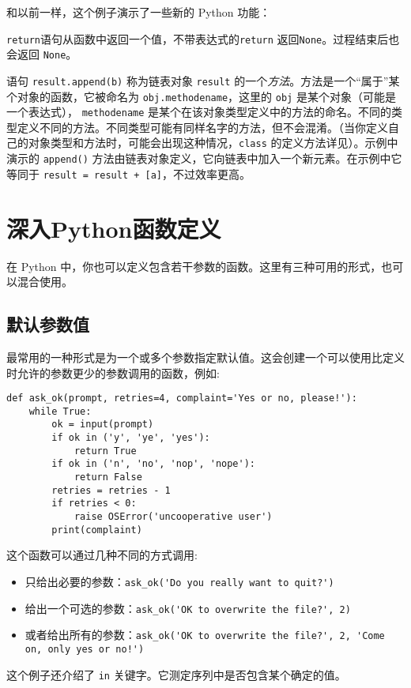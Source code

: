 和以前一样，这个例子演示了一些新的 Python 功能：
\begin{compactitem}
  \item \texttt{return}语句从函数中返回一个值，不带表达式的\texttt{return} 返回\texttt{None}。过程结束后也会返回 \texttt{None}。
  \item 语句 \texttt{result.append(b)} 称为链表对象 \texttt{result} 的一个\emph{方法}。方法是一个“属于”某个对象的函数，它被命名为 \texttt{obj.methodename}，这里的 \texttt{obj} 是某个对象（可能是一个表达式）， \texttt{methodename} 是某个在该对象类型定义中的方法的命名。不同的类型定义不同的方法。不同类型可能有同样名字的方法，但不会混淆。（当你定义自己的对象类型和方法时，可能会出现这种情况，\texttt{class} 的定义方法详见）。示例中演示的 \texttt{append()} 方法由链表对象定义，它向链表中加入一个新元素。在示例中它等同于 \texttt{result = result + [a]}，不过效率更高。
\end{compactitem}
\section{深入Python函数定义}
\label{ControlFlowTools:MoreDefFunc}
在 Python 中，你也可以定义包含若干参数的函数。这里有三种可用的形式，也可以混合使用。
\subsection{默认参数值}
最常用的一种形式是为一个或多个参数指定默认值。这会创建一个可以使用比定义时允许的参数更少的参数调用的函数，例如:
\begin{lstlisting}
def ask_ok(prompt, retries=4, complaint='Yes or no, please!'):
    while True:
        ok = input(prompt)
        if ok in ('y', 'ye', 'yes'):
            return True
        if ok in ('n', 'no', 'nop', 'nope'):
            return False
        retries = retries - 1
        if retries < 0:
            raise OSError('uncooperative user')
        print(complaint)
\end{lstlisting}

这个函数可以通过几种不同的方式调用:
\begin{itemize}
  \item 只给出必要的参数：\verb|ask_ok('Do you really want to quit?')|
  \item 给出一个可选的参数：\verb|ask_ok('OK to overwrite the file?', 2)|
  \item 或者给出所有的参数：\verb|ask_ok('OK to overwrite the file?', 2, 'Come on, only yes or no!')|
\end{itemize}
这个例子还介绍了 \texttt{in} 关键字。它测定序列中是否包含某个确定的值。


